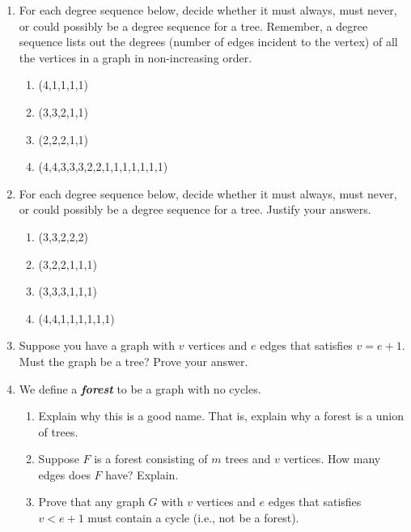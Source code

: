\documentclass[11pt,a4paper]{article}
\newcommand\setItemNumber[1]{\setcounter{enumi}{\numexpr#1-1\relax}}
\begin{document}
        \begin{enumerate}

        \setItemNumber{2}
        \item For each degree sequence below, decide whether it must always, must never, or could possibly be a degree sequence for a tree. Remember, a degree sequence lists out the degrees (number of edges incident to the vertex) of all the vertices in a graph in non-increasing order.

            \begin{enumerate}
                \item (4,1,1,1,1)
                \item (3,3,2,1,1)
                \item (2,2,2,1,1)
                \item (4,4,3,3,3,2,2,1,1,1,1,1,1,1)

            \end{enumerate}

        \item For each degree sequence below, decide whether it must always, must never, or could possibly be a degree sequence for a tree. Justify your answers.

            \begin{enumerate}
                \item (3,3,2,2,2)
                \item (3,2,2,1,1,1)
                \item (3,3,3,1,1,1)
                \item (4,4,1,1,1,1,1,1)
            \end{enumerate}

        \item Suppose you have a graph with $v$ vertices and $e$ edges that satisfies $v=e+1$. Must the graph be a tree? Prove your answer.

        \setItemNumber{7}
        \item We define a \textbf{\emph{forest}} to be a graph with no cycles.
            \begin{enumerate}
                \item Explain why this is a good name. That is, explain why a forest is a union of trees.
                \item Suppose $F$ is a forest consisting of $m$ trees and $v$ vertices. How many edges does $F$ have? Explain.
                \item Prove that any graph $G$ with $v$ vertices and $e$ edges that satisfies $v<e+1$ must contain a cycle (i.e., not be a forest).
            \end{enumerate}


\end{enumerate}
\end{document}

